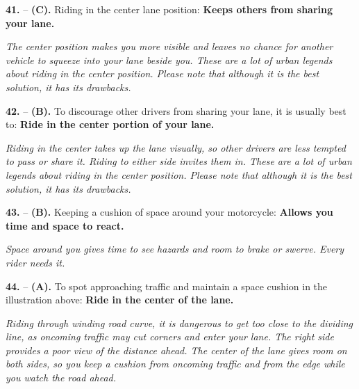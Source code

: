 \begin{minipage}{\linewidth}
\noindent\textbf{41.}  -- \textbf {(C).} Riding in the center lane position:  \textbf {Keeps others from sharing your lane.} \par \textit {The center position makes you more visible and leaves no chance for another vehicle to squeeze into your lane beside you. These are a lot of urban legends about riding in the center position. Please note that although it is the best solution, it has its drawbacks.} \\
\end{minipage}

\begin{minipage}{\linewidth}
\noindent\textbf{42.}  -- \textbf {(B).} To discourage other drivers from sharing your lane, it is usually best to:  \textbf {Ride in the center portion of your lane.} \par \textit {Riding in the center takes up the lane visually, so other drivers are less tempted to pass or share it. Riding to either side invites them in. These are a lot of urban legends about riding in the center position. Please note that although it is the best solution, it has its drawbacks.} \\
\end{minipage}

\begin{minipage}{\linewidth}
\noindent\textbf{43.}  -- \textbf {(B).} Keeping a cushion of space around your motorcycle:  \textbf {Allows you time and space to react.} \par \textit {Space around you gives time to see hazards and room to brake or swerve. Every rider needs it.} \\
\end{minipage}

\begin{minipage}{\linewidth}
\noindent\textbf{44.}  -- \textbf {(A).} To spot approaching traffic and maintain a space cushion in the illustration above:  \textbf {Ride in the center of the lane.} \par \textit {Riding through winding road curve, it is dangerous to get too close to the dividing line, as oncoming traffic may cut corners and enter your lane. The right side provides a poor view of the distance ahead. The center of the lane gives room on both sides, so you keep a cushion from oncoming traffic and from the edge while you watch the road ahead.} \\
\end{minipage}

